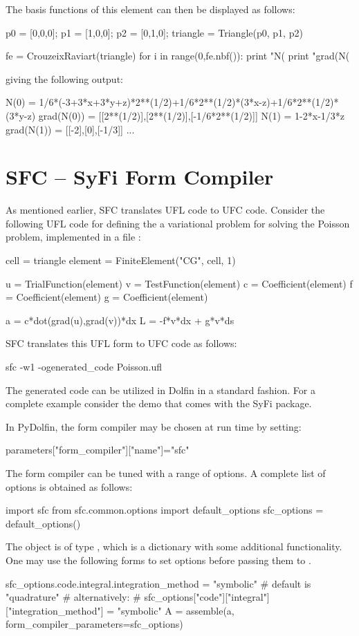 The basis functions of this element can then be displayed as follows: 
\begin{python}
p0 = [0,0,0]; p1 = [1,0,0]; p2 = [0,1,0]; 
triangle = Triangle(p0, p1, p2) 

fe = CrouzeixRaviart(triangle)
for i in range(0,fe.nbf()): 
  print "N(%
  print "grad(N(%
\end{python}
giving the following output: 
\begin{c++}
N(0)       =  1/6*(-3+3*x+3*y+z)*2**(1/2)+1/6*2**(1/2)*(3*x-z)+1/6*2**(1/2)*(3*y-z)
grad(N(0)) =  [[2**(1/2)],[2**(1/2)],[-1/6*2**(1/2)]]
N(1)       =  1-2*x-1/3*z
grad(N(1)) =  [[-2],[0],[-1/3]]
...
\end{c++}



\section{SFC -- SyFi Form Compiler}

As mentioned earlier, SFC translates UFL code to UFC code. Consider the 
following UFL code for defining the a variational problem for solving
the Poisson problem, implemented in a file :
\begin{python}
cell = triangle
element = FiniteElement("CG", cell, 1)

u = TrialFunction(element)
v = TestFunction(element)
c = Coefficient(element)
f = Coefficient(element)
g = Coefficient(element)

a = c*dot(grad(u),grad(v))*dx
L = -f*v*dx + g*v*ds
\end{python}
SFC translates this UFL form to UFC code as follows: 
\begin{bash}
sfc -w1  -ogenerated_code Poisson.ufl
\end{bash}
The generated code can be utilized in Dolfin in a standard fashion. 
For a complete example consider the demo  that
comes with the SyFi package. 

In PyDolfin, the form compiler may be chosen at run time by setting:  
\begin{python}
  parameters["form_compiler"]["name"]="sfc"
\end{python}
The form compiler can be tuned with a range of options. A complete list of options is obtained as follows:  
\begin{python}
import sfc 
from sfc.common.options import default_options
sfc_options = default_options()
\end{python}
The object  is of type , which is a dictionary with some 
additional functionality. One may use the following forms to set options before passing them to .  
\begin{python}
sfc_options.code.integral.integration_method = "symbolic" # default is "quadrature"  
# alternatively:  
# sfc_options["code"]["integral"]["integration_method"] = "symbolic"  
A = assemble(a, form_compiler_parameters=sfc_options)
\end{python}

